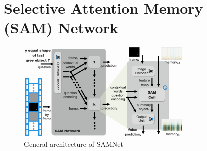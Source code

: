 \section{Selective Attention Memory (SAM) Network}



\begin{figure}
	\centering
	\includegraphics[width=0.76\textwidth]{../img/architecture/samnet_architecture4}
	\caption{General architecture of SAMNet}
	\label{fig:samnet}
\end{figure}

